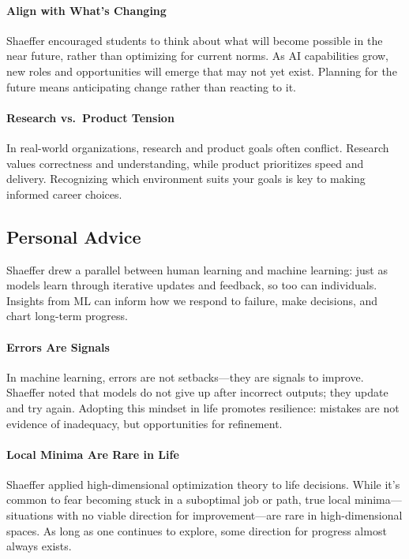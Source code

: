 \paragraph{Align with What's Changing}
Shaeffer encouraged students to think about what will become possible in the near future, rather than optimizing for current norms.
As AI capabilities grow, new roles and opportunities will emerge that may not yet exist.
Planning for the future means anticipating change rather than reacting to it.

\paragraph{Research vs.\ Product Tension}
In real-world organizations, research and product goals often conflict.
Research values correctness and understanding, while product prioritizes speed and delivery.
Recognizing which environment suits your goals is key to making informed career choices.

\subsection{Personal Advice}

Shaeffer drew a parallel between human learning and machine learning: just as models learn through iterative updates and feedback, so too can individuals.
Insights from ML can inform how we respond to failure, make decisions, and chart long-term progress.

\paragraph{Errors Are Signals}
In machine learning, errors are not setbacks---they are signals to improve.
Shaeffer noted that models do not give up after incorrect outputs; they update and try again.
Adopting this mindset in life promotes resilience: mistakes are not evidence of inadequacy, but opportunities for refinement.

\paragraph{Local Minima Are Rare in Life}
Shaeffer applied high-dimensional optimization theory to life decisions.
While it's common to fear becoming stuck in a suboptimal job or path, true local minima---situations with no viable direction for improvement---are rare in high-dimensional spaces.
As long as one continues to explore, some direction for progress almost always exists.

